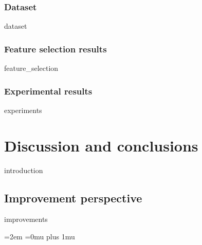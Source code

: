 \documentclass[12pt]{report}
\begin{document}
         \subsection{Dataset}
        {dataset}
     
        \subsection{Feature selection results}
        \label{sec:feature_selection_noise}
        {feature_selection}
        
        \subsection{Experimental results}	
        {experiments}

\chapter{Discussion and conclusions}        
    \label{chapter:conclusions}
    {introduction}
    
    \section{Improvement perspective}
    {improvements}
   



\newpage
\emergencystretch=2em
\Urlmuskip=0mu plus 1mu\relax

\printbibliography[heading=bibintoc]
\newpage
\listoffigures
\newpage
\listoftables
\newpage
\end{document}
